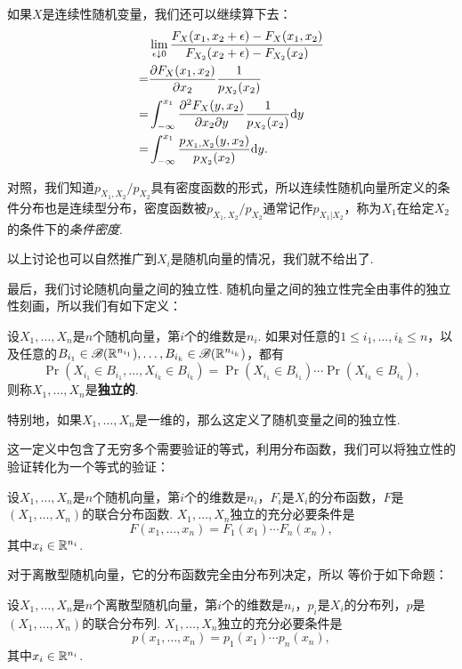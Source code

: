 如果$X$是连续性随机变量，我们还可以继续算下去：
\begin{align*}
    &\lim_{\epsilon\downarrow 0}\frac{F_X(x_1,x_2+\epsilon)-F_X(x_1,x_2)}{F_{X_2}(x_2+\epsilon)-F_{X_2}(x_2)}\\
    =&\frac{\partial F_X(x_1,x_2)}{\partial x_2}\frac{1}{p_{X_2}(x_2)}\\
    =&\int_{-\infty}^{x_1}\frac{\partial^2 F_X(y,x_2)}{\partial x_2\partial y}\frac{1}{p_{X_2}(x_2)}\mathrm{d} y\\
    =&\int_{-\infty}^{x_1}\frac{p_{X_1,X_2}(y,x_2)}{p_{X_2}(x_2)}\mathrm{d} y.
\end{align*}

对照，我们知道$p_{X_1,X_2}/p_{X_2}$具有密度函数的形式，所以连续性随机向量所定义的条件分布也是连续型分布，密度函数被$p_{X_1,X_2}/p_{X_2}$通常记作$p_{X_1|X_2}$，称为$X_1$在给定$X_2$的条件下的\emph{条件密度}. 

以上讨论也可以自然推广到$X_i$是随机向量的情况，我们就不给出了. 

最后，我们讨论随机向量之间的独立性. 随机向量之间的独立性完全由事件的独立性刻画，所以我们有如下定义：

\begin{definition}[随机向量的独立性]
设$X_1,\dots,X_n$是$n$个随机向量，第$i$个的维数是$n_i$. 如果对任意的$1\leq i_1,\dots,i_k\leq n$，以及任意的$B_{i_1}\in\mathscr{B}(\mathbb{R}^{n_{i_1}}),\dots,B_{i_k}\in\mathscr{B}(\mathbb{R}^{n_{i_k}})$，都有
\[\Pr(X_{i_1}\in B_{i_1},\dots,X_{i_k}\in B_{i_k})=\Pr(X_{i_1}\in B_{i_1})\cdots\Pr(X_{i_k}\in B_{i_k}),\]
则称$X_1,\dots,X_n$是\textbf{独立的}. 

特别地，如果$X_1,\dots,X_n$是一维的，那么这定义了随机变量之间的独立性. 
\end{definition}

这一定义中包含了无穷多个需要验证的等式，利用分布函数，我们可以将独立性的验证转化为一个等式的验证：

\begin{proposition}\label{prop:independence}
设$X_1,\dots,X_n$是$n$个随机向量，第$i$个的维数是$n_i$，$F_i$是$X_i$的分布函数，$F$是$(X_1,\dots,X_n)$的联合分布函数. $X_1,\dots,X_n$独立的充分必要条件是
\[F(x_1,\dots,x_n)=F_1(x_1)\cdots F_n(x_n),\]
其中$x_i\in\mathbb{R}^{n_i}$.
\end{proposition}

对于离散型随机向量，它的分布函数完全由分布列决定，所以 等价于如下命题：

\begin{proposition}\label{prop:independence-discrete}
设$X_1,\dots,X_n$是$n$个离散型随机向量，第$i$个的维数是$n_i$，$p_i$是$X_i$的分布列，$p$是$(X_1,\dots,X_n)$的联合分布列. $X_1,\dots,X_n$独立的充分必要条件是
\[p(x_1,\dots,x_n)=p_1(x_1)\cdots p_n(x_n),\]
其中$x_i\in\mathbb{R}^{n_i}$.
\end{proposition}

